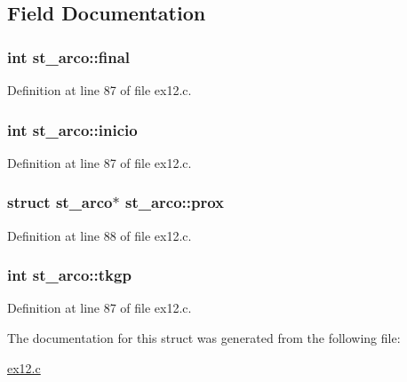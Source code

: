 \subsection{Field Documentation}
\hypertarget{structst__arco_a2215b7a64f0bc19a8916059b80a8a7e4}{
\subsubsection[{final}]{\setlength{\rightskip}{0pt plus 5cm}int st\+\_\+arco\+::final}}\label{structst__arco_a2215b7a64f0bc19a8916059b80a8a7e4}


Definition at line 87 of file ex12.\+c.

\hypertarget{structst__arco_a640a8b25b7f08e94cc6e535523aa8857}{
\subsubsection[{inicio}]{\setlength{\rightskip}{0pt plus 5cm}int st\+\_\+arco\+::inicio}}\label{structst__arco_a640a8b25b7f08e94cc6e535523aa8857}


Definition at line 87 of file ex12.\+c.

\hypertarget{structst__arco_a7e122db30f69e19aed8a7ce0295920c0}{
\subsubsection[{prox}]{\setlength{\rightskip}{0pt plus 5cm}struct {\bf st\+\_\+arco}$\ast$ st\+\_\+arco\+::prox}}\label{structst__arco_a7e122db30f69e19aed8a7ce0295920c0}


Definition at line 88 of file ex12.\+c.

\hypertarget{structst__arco_aa9099d2432e77829a68e2aacea614b57}{
\subsubsection[{tkgp}]{\setlength{\rightskip}{0pt plus 5cm}int st\+\_\+arco\+::tkgp}}\label{structst__arco_aa9099d2432e77829a68e2aacea614b57}


Definition at line 87 of file ex12.\+c.



The documentation for this struct was generated from the following file\+:\begin{DoxyCompactItemize}
\item 
\hyperlink{ex12_8c}{ex12.\+c}\end{DoxyCompactItemize}
